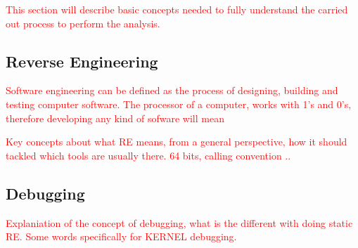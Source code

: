     \textcolor{red}{This section will describe basic concepts needed to fully understand the carried out process to perform the analysis.}
\subsection{Reverse Engineering}
\textcolor{red}{Software engineering can be defined as the process of designing, building and testing computer software. The processor of a computer, works with 1's and 0's, therefore developing any kind of sofware will mean }

\textcolor{red}{Key concepts about what RE means, from a general perspective, how it should tackled which tools are usually there.  64 bits, calling convention .. }
\subsection{Debugging}\label{debugging}
\textcolor{red}{Explaniation of the concept of debugging, what is the different with doing static RE. Some words specifically for KERNEL debugging. }